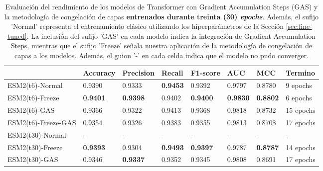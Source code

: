 \begin{table}[]
	\centering
	\caption[Comparación de los modelos Transformer entrenados por 30 \textit{epochs}.]{
		Evaluación del rendimiento de los modelos de Transformer con Gradient Accumulation Steps (GAS) y la metodología de congelación de capas \textbf{entrenados durante treinta (30) \textit{epochs}}. Además, el sufijo 'Normal' representa el entrenamiento clásico utilizando los hiperparámetros de la Sección \ref{sec:fine-tuned}. La inclusión del sufijo 'GAS' en cada modelo indica la integración de Gradient Accumulation Steps, mientras que el sufijo 'Freeze' señala nuestra aplicación de la metodología de congelación de capas a los modelos. Además, el guion '-' en cada celda indica que el modelo no pudo converger.}
	\label{tab:comparison}
	\footnotesize
	\setlength{\tabcolsep}{0.5em} %
	{\renewcommand{\arraystretch}{1.5}%
	\begin{tabular}{llllllll} 
		\textbf{}            & \textbf{Accuracy} & \textbf{Precision} & \textbf{Recall} & \textbf{F1-score} & \textbf{AUC}    & \textbf{MCC}    & \textbf{Termino} \\ \midrule
		ESM2(t6)-Normal             & 0.9390            & 0.9333             & \textbf{0.9453} & 0.9392            & 0.9797          & 0.8780          & 9 epochs            \\
		ESM2(t6)-Freeze      & \textbf{0.9401}   & \textbf{0.9398}    & 0.9402          & \textbf{0.9400}   & \textbf{0.9830} & \textbf{0.8802} & 6 epochs            \\
		ESM2(t6)-GAS         & 0.9366            & 0.9322             & 0.9413          & 0.9368            & 0.9818          & 0.8732          & 15 epochs           \\
		ESM2(t6)-Freeze-GAS  & 0.9354            & 0.9326             & 0.9383          & 0.9355            & 0.9813          & 0.8708          & 17 epochs           \\ \midrule
		ESM2(t30)-Normal            & -                 & -                  & -               & -                 & -               & -               & -                   \\
		ESM2(t30)-Freeze     & \textbf{0.9393}   & 0.9304             & \textbf{0.9493} & \textbf{0.9397}   & 0.9787          & \textbf{0.8787} & 14 epochs           \\
		ESM2(t30)-GAS        & 0.9346            & \textbf{0.9337}    & 0.9352          & 0.9345            & 0.9808          & 0.8691          & 17 epochs           \\

\end{tabular}}
\end{table}

